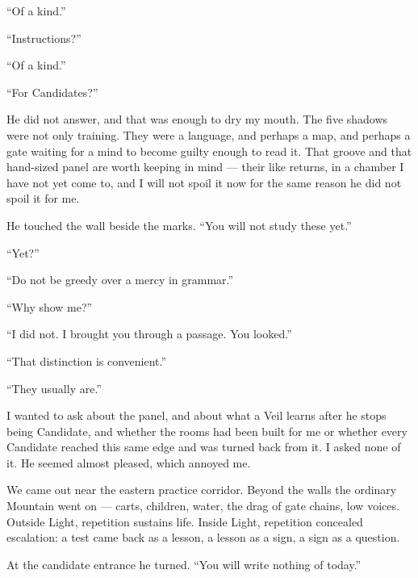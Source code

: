 ``Of a kind.''\par

``Instructions?''\par

``Of a kind.''\par

``For Candidates?''\par

He did not answer, and that was enough to dry my mouth. The five shadows were not only training. They were a language, and perhaps a map, and perhaps a gate waiting for a mind to become guilty enough to read it. That groove and that hand-sized panel are worth keeping in mind --- their like returns, in a chamber I have not yet come to, and I will not spoil it now for the same reason he did not spoil it for me.\par

He touched the wall beside the marks. ``You will not study these yet.''\par

``Yet?''\par

``Do not be greedy over a mercy in grammar.''\par

``Why show me?''\par

``I did not. I brought you through a passage. You looked.''\par

``That distinction is convenient.''\par

``They usually are.''\par

I wanted to ask about the panel, and about what a Veil learns after he stops being Candidate, and whether the rooms had been built for me or whether every Candidate reached this same edge and was turned back from it. I asked none of it. He seemed almost pleased, which annoyed me.\par

\ornament

We came out near the eastern practice corridor. Beyond the walls the ordinary Mountain went on --- carts, children, water, the drag of gate chains, low voices. Outside Light, repetition sustains life. Inside Light, repetition concealed escalation: a test came back as a lesson, a lesson as a sign, a sign as a question.\par

At the candidate entrance he turned. ``You will write nothing of today.''\par

